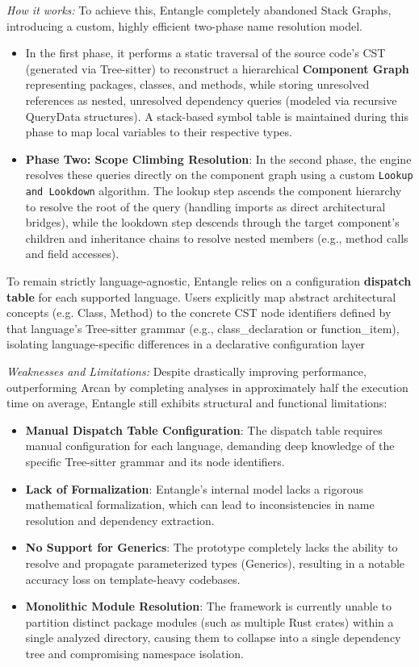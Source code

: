 \textit{How it works:} To achieve this, Entangle completely abandoned
Stack Graphs, introducing a custom, highly efficient two-phase name
resolution model.
\begin{itemize}
  \item In the first phase, it performs a static traversal of the
    source code's CST (generated via Tree-sitter) to reconstruct a
    hierarchical \textbf{Component Graph} representing packages,
    classes, and methods, while storing unresolved references as
    nested, unresolved dependency queries (modeled via recursive
    QueryData structures). A stack-based symbol table is maintained
    during this phase to map local variables to their respective types.
  \item \textbf{Phase Two: Scope Climbing Resolution}: In the second
    phase, the engine resolves these queries directly on the
    component graph using a custom \texttt{Lookup and Lookdown}
    algorithm. The lookup step ascends the component hierarchy to
    resolve the root of the query (handling imports as direct
    architectural bridges), while the lookdown step descends through
    the target component's children and inheritance chains to resolve
    nested members (e.g., method calls and field accesses).
\end{itemize}

To remain strictly language-agnostic, Entangle relies on a
configuration \textbf{dispatch table} for each supported language.
Users explicitly map abstract architectural concepts (e.g. Class,
Method) to the concrete CST node identifiers defined by that
language's Tree-sitter grammar (e.g., class\_declaration or
function\_item), isolating language-specific differences in a
declarative configuration layer

\textit{Weaknesses and Limitations:} Despite drastically improving
performance, outperforming Arcan \cite{fontana_arcan_2017} by completing
analyses in approximately half the execution time on average,
Entangle still exhibits structural and functional limitations:

\begin{itemize}
  \item \textbf{Manual Dispatch Table Configuration}: The dispatch
    table requires manual configuration for each language, demanding
    deep knowledge of the specific Tree-sitter grammar and its node
    identifiers.
  \item \textbf{Lack of Formalization}: Entangle's internal model
    lacks a rigorous mathematical formalization, which can lead to
    inconsistencies in name resolution and dependency extraction.
  \item \textbf{No Support for Generics}: The prototype completely
    lacks the ability to resolve and propagate parameterized types
    (Generics), resulting in a notable accuracy loss on
    template-heavy codebases.
  \item \textbf{Monolithic Module Resolution}: The framework is
    currently unable to partition distinct package modules (such as
    multiple Rust crates) within a single analyzed directory, causing
    them to collapse into a single dependency tree and compromising
    namespace isolation.
\end{itemize}

